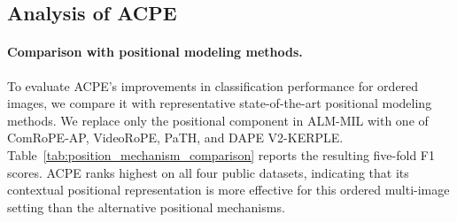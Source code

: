 
\subsection{Analysis of ACPE}
\label{sec:acpe_analysis}

\paragraph{Comparison with positional modeling methods.}
To evaluate ACPE's improvements in classification performance for ordered images, we compare it with representative state-of-the-art positional modeling methods. We replace only the positional component in ALM-MIL with one of ComRoPE-AP, VideoRoPE, PaTH, and DAPE V2-KERPLE. Table~\ref{tab:position_mechanism_comparison} reports the resulting five-fold F1 scores. ACPE ranks highest on all four public datasets, indicating that its contextual positional representation is more effective for this ordered multi-image setting than the alternative positional mechanisms.


